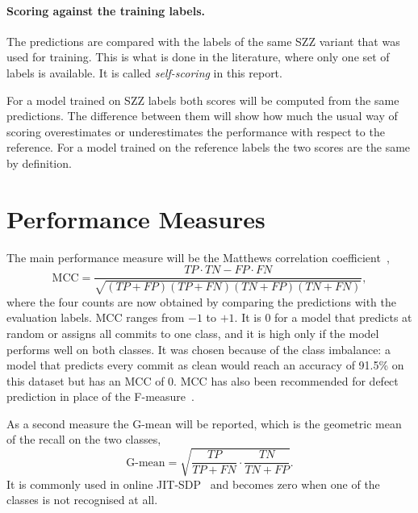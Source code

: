 \documentclass[12pt,a4paper,oneside]{report}
\begin{document}
\paragraph{Scoring against the training labels.} The predictions are
compared with the labels of the same SZZ variant that was used for training.
This is what is done in the literature, where only one set of labels is
available. It is called \emph{self-scoring} in this report.

For a model trained on SZZ labels both scores will be computed from the same
predictions. The difference between them will show how much the usual way of
scoring overestimates or underestimates the performance with respect to the
reference. For a model trained on the reference labels the two scores are the
same by definition.

\section{Performance Measures}\label{sec:measures}

The main performance measure will be the Matthews correlation
coefficient~\cite{matthews1975mcc},
\begin{equation}
\mathrm{MCC} = \frac{TP\cdot TN - FP\cdot FN}
{\sqrt{(TP+FP)(TP+FN)(TN+FP)(TN+FN)}},
\end{equation}
where the four counts are now obtained by comparing the predictions with the
evaluation labels. MCC ranges from $-1$ to $+1$. It is 0 for a model that
predicts at random or assigns all commits to one class, and it is high only
if the model performs well on both classes. It was chosen because of the
class imbalance: a model that predicts every commit as clean would reach an
accuracy of 91.5\% on this dataset but has an MCC of 0. MCC has also been
recommended for defect prediction in place of the
F-measure~\cite{yao2020mcc,chicco2020mcc}.

As a second measure the G-mean will be reported, which is the geometric mean
of the recall on the two classes,
\begin{equation}
\text{G-mean} = \sqrt{\frac{TP}{TP+FN}\cdot\frac{TN}{TN+FP}}.
\end{equation}
It is commonly used in online JIT-SDP~\cite{cabral2019orb} and becomes zero
when one of the classes is not recognised at all.
\end{document}
